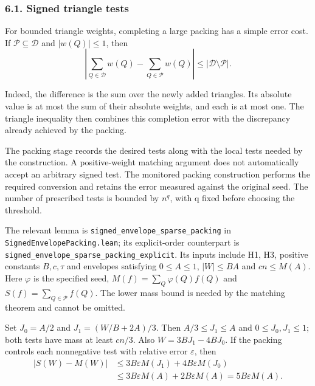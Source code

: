 \documentclass[english,11pt,a4paper]{article}
\begin{document}
\subsubsection{6.1. Signed triangle tests}\label{signed-triangle-tests}

For bounded triangle weights, completing a large packing has a simple error cost. If \(\mathcal P\subseteq\mathcal D\) and \(|w(Q)|\leq1\), then
\[\left|\sum_{Q\in\mathcal D}w(Q)-\sum_{Q\in\mathcal P}w(Q)\right|
\leq|\mathcal D\setminus\mathcal P|.                               \tag{6.1}\]

Indeed, the difference is the sum over the newly added triangles. Its absolute value is at most the sum of their absolute weights, and each is at most one. The triangle inequality then combines this completion error with the discrepancy already achieved by the packing.

The packing stage records the desired tests along with the local tests needed by the construction. A positive-weight matching argument does not automatically accept an arbitrary signed test. The monitored packing construction performs the required conversion and retains the error measured against the original seed. The number of prescribed tests is bounded by \(n^q\), with q fixed before choosing the threshold.

The relevant lemma is \texttt{signed\_\allowbreak{}envelope\_\allowbreak{}sparse\_\allowbreak{}packing} in \texttt{Signed\allowbreak{}Envelope\allowbreak{}Packing.\allowbreak{}lean}; its explicit-order counterpart is \texttt{signed\_\allowbreak{}envelope\_\allowbreak{}sparse\_\allowbreak{}packing\_\allowbreak{}explicit}. Its inputs include H1, H3, positive constants \(B,c,\tau\) and envelopes satisfying \(0\leq A\leq1\), \(|W|\leq BA\) and \(cn\leq M(A)\). Here \(\varphi\) is the specified seed, \(M(f)=\sum_Q\varphi(Q)f(Q)\) and \(S(f)=\sum_{Q\in\mathcal P}f(Q)\). The lower mass bound is needed by the matching theorem and cannot be omitted.

Set \(J_0=A/2\) and \(J_1=(W/B+2A)/3\). Then \(A/3\leq J_1\leq A\) and \(0\leq J_0,J_1\leq1\); both tests have mass at least \(cn/3\). Also \(W=3BJ_1-4BJ_0\). If the packing controls each nonnegative test with relative error \(\varepsilon\), then
\[\begin{aligned}|S(W)-M(W)|&\leq3B\varepsilon M(J_1)+4B\varepsilon M(J_0)\\&\leq3B\varepsilon M(A)+2B\varepsilon M(A)=5B\varepsilon M(A).\end{aligned}\]
\end{document}
